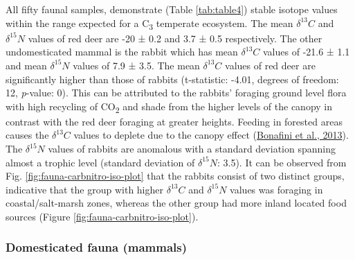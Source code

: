 \documentclass[3p]{elsarticle} %
\begin{document}
All fifty faunal samples, demonstrate (Table \ref{tab:table4}) stable isotope values within the range expected for a C\textsubscript{3} temperate ecosystem. The mean \(\delta ^{13}C\) and \(\delta ^{15}N\) values of red deer are -20 ± 0.2\text{\textperthousand} and 3.7 ± 0.5\text{\textperthousand} respectively. The other undomesticated mammal is the rabbit which has mean \(\delta ^{13}C\) values of -21.6 ± 1.1\text{\textperthousand} and mean \(\delta ^{15}N\) values of 7.9 ± 3.5\text{\textperthousand}. The mean \(\delta ^{13}C\) values of red deer are significantly higher than those of rabbits (t-statistic: -4.01, degrees of freedom: 12, \emph{p}-value: 0). This can be attributed to the rabbits' foraging ground level flora with high recycling of CO\textsubscript{2} and shade from the higher levels of the canopy in contrast with the red deer foraging at greater heights. Feeding in forested areas causes the \(\delta ^{13}C\) values to deplete due to the canopy effect (\protect\hyperlink{ref-bonafini_etal13}{Bonafini et al., 2013}). The \(\delta ^{15}N\) values of rabbits are anomalous with a standard deviation spanning almost a trophic level (standard deviation of \(\delta ^{15}N\): 3.5\text{\textperthousand}). It can be observed from Fig. \ref{fig:fauna-carbnitro-iso-plot} that the rabbits consist of two distinct groups, indicative that the group with higher \(\delta ^{13}C\) and \(\delta ^{15}N\) values was foraging in coastal/salt-marsh zones, whereas the other group had more inland located food sources (Figure \ref{fig:fauna-carbnitro-iso-plot}).

\hypertarget{domesticated-fauna-mammals}{%
\subsubsection{Domesticated fauna (mammals)}\label{domesticated-fauna-mammals}}
\end{document}
